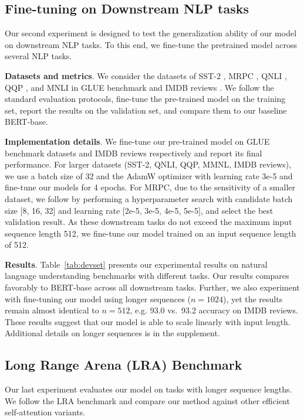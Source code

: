 \subsection{Fine-tuning on Downstream NLP tasks} Our second experiment is designed to test the generalization ability of our model on downstream NLP tasks. To this end, we fine-tune the pretrained model across several NLP tasks. 

\smallskip
 \textbf{Datasets and metrics}. We consider the datasets of SST-2 \cite{socher2013recursive}, MRPC \cite{dolan2005automatically}, QNLI \cite{rajpurkar2016squad}, QQP \cite{chen2018quora}, and MNLI \cite{williams2018broad} in GLUE benchmark and IMDB reviews \cite{maas2011learning}. We follow the standard evaluation protocols, fine-tune the pre-trained model on the training set, report the results on the validation set, and compare them to our baseline BERT-base.

\smallskip
 \textbf{Implementation details}. We fine-tune our pre-trained model on GLUE benchmark datasets and IMDB reviews respectively and report its final performance. For larger datasets (SST-2, QNLI, QQP, MMNL, IMDB reviews), we use a batch size of 32 and the AdamW optimizer with learning rate 3e-5 and fine-tune our models for 4 epochs. For MRPC, due to the sensitivity of a smaller dataset, we follow \cite{devlin2019bert} by performing a hyperparameter search with candidate batch size $[$8, 16, 32$]$ and learning rate $[$2e-5, 3e-5, 4e-5, 5e-5$]$, and select the best validation result. As these downstream tasks do not exceed the maximum input sequence length 512, we fine-tune our model trained on an input sequence length of 512.

\smallskip
 \textbf{Results}. Table~\ref{tab:devset} presents our experimental results on natural language understanding benchmarks with different tasks. Our results compares favorably to BERT-base across all downstream tasks. Further, we also experiment with fine-tuning our model using longer sequences ($n=1024$), yet the results remain almost identical to $n=512$, e.g. 93.0 vs.\ 93.2 accuracy on IMDB reviews. These results suggest that our model is able to scale linearly with input length. Additional details on longer sequences is in the supplement. 

\subsection{Long Range Arena (LRA) Benchmark} Our last experiment evaluates our model on tasks with longer sequence lengths. We follow the LRA benchmark \cite{tay2020long} and compare our method against other efficient self-attention variants. 

